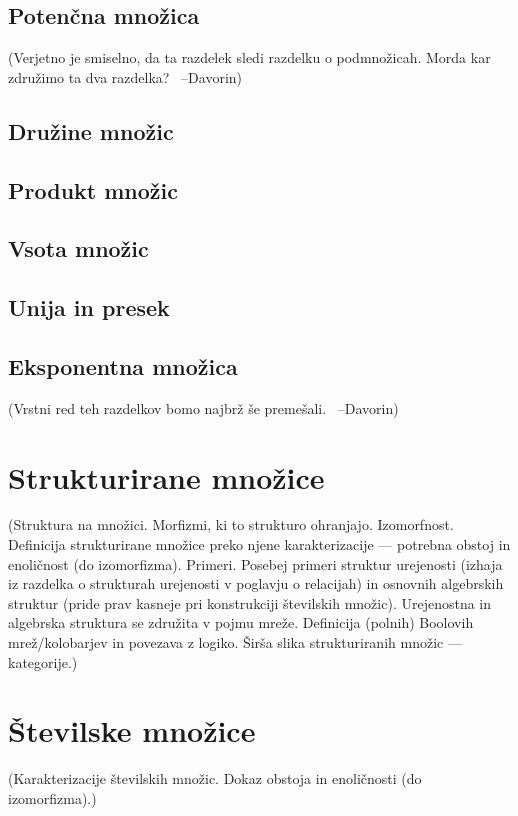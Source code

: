 \documentclass[11pt,a4paper,twoside]{book}
\newcommand{\davorin}[1]{{\small\textcolor{davorincolor}{(#1 \ \mbox{--Davorin})}}}
\newcommand{\note}[1]{{\small\textcolor{notecolor}{(#1)}}}
\begin{document}
                \section{Potenčna množica}
                        \davorin{Verjetno je smiselno, da ta razdelek sledi razdelku o podmnožicah. Morda kar združimo ta dva razdelka?}
                \section{Družine množic}
                \section{Produkt množic}
                \section{Vsota množic}
                \section{Unija in presek}
                \section{Eksponentna množica}
                        \davorin{Vrstni red teh razdelkov bomo najbrž še premešali.}
        
        
        
        
        \chapter{Strukturirane množice}
                \note{Struktura na množici. Morfizmi, ki to strukturo ohranjajo. Izomorfnost. Definicija strukturirane množice preko njene karakterizacije --- potrebna obstoj in enoličnost (do izomorfizma). Primeri. Posebej primeri struktur urejenosti (izhaja iz razdelka o strukturah urejenosti v poglavju o relacijah) in osnovnih algebrskih struktur (pride prav kasneje pri konstrukciji številskih množic). Urejenostna in algebrska struktura se združita v pojmu mreže. Definicija (polnih) Boolovih mrež/kolobarjev in povezava z logiko. Širša slika strukturiranih množic --- kategorije.}
        
        \chapter{Številske množice}
                \note{Karakterizacije številskih množic. Dokaz obstoja in enoličnosti (do izomorfizma).}
\end{document}
